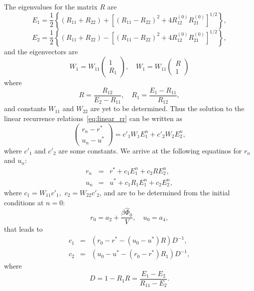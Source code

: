 The eigenvalues for the matrix $R$ are
\begin{equation*}
	E_1 = \frac{1}{2} \left\{ (R_{11} + R_{22}) + \left[(R_{11} - R_{22})^2 + 4 R_{12}^{(0)}R_{21}^{(0)}\right]^{1/2}\right\},
\end{equation*}
\begin{equation*}
	E_2 = \frac{1}{2} \left\{ (R_{11} + R_{22}) - \left[(R_{11} - R_{22})^2 + 4 R_{12}^{(0)}R_{21}^{(0)}\right]^{1/2}\right\},
\end{equation*}
and the eigenvectors are
\begin{equation*}
	W_1 = W_{11} \left(
	\begin{array}{ll}
		1 
		\\ 
		R_1
	\end{array}
	\right)
	, \quad
	W_1 = W_{11} \left(
	\begin{array}{ll}
		R 
		\\ 
		1
	\end{array}
	\right)
\end{equation*}
where 
\begin{equation*}
	R = \frac{R_{12}}{E_2 - R_{11}}, \quad R_1 = \frac{E_1 - R_{11}}{R_{12}},
\end{equation*}
and constants $W_{11}$ and $W_{22}$ are yet to be determined.
Thus the solution to the linear recurrence relations~\eqref{eq:linear_rr} can be written as
\begin{equation}
	\left(
	\begin{array}{ll}
		r_n - r^*
		\\
		u_n - u^*
	\end{array}
	\right)
	= c'_1 W_1 E_1^n + c'_2 W_2 E_2^n,
\end{equation}
where $c'_1$ and $c'_2$ are some constants. We arrive at the following equatinos for $r_n$ and $u_n$:
\begin{eqnarray}
	r_n & = & r^* + c_1 E_1^n + c_2 R E_2^n,
	\nonumber \\
	u_n & = & u^* + c_1 R_1 E_1^n + c_2 E_2^n,
\end{eqnarray}
where $c_1 = W_{11} c'_1,$ $c_2 = W_{22} c'_2$, and are to be determined from the initial conditions at $n=0$:
\begin{equation*}
	r_0 = a_2 + \frac{\beta\hat{\Phi}_0}{V},
	\quad
	u_0 = a_4,
\end{equation*}
that leads to
\begin{eqnarray*}
	c_1 & = & (r_0 - r^* -(u_0 - u^*)R)D^{-1},
	\\
	c_2 & = &  (u_0 - u^* - (r_0 - r^*)R_1)D^{-1},
\end{eqnarray*}
where
\begin{equation*}
	D = 1 - R_1 R = \frac{E_1 - E_2}{R_{11} - E_2}.
\end{equation*}

